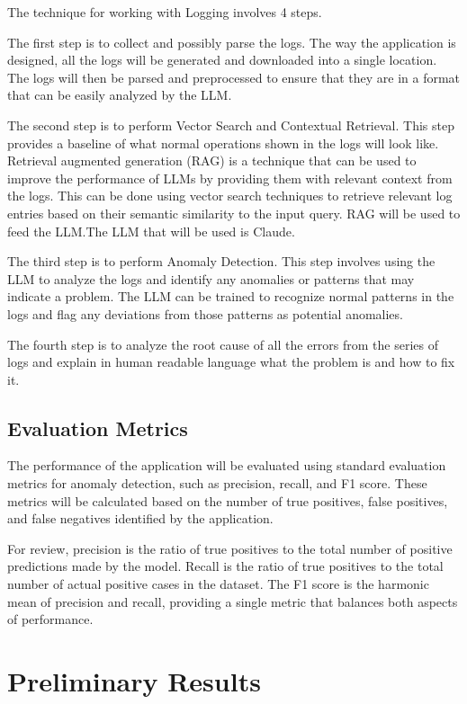 \documentclass[sigconf]{acmart}
\begin{document}
The technique for working with Logging involves 4 steps. 

The first step is to collect and possibly parse the logs. The way the application is designed, all the logs will be generated and downloaded into a single location. The logs will then be parsed and preprocessed to ensure that they are in a format that can be easily analyzed by the LLM.

The second step is to perform Vector Search and Contextual Retrieval. This step provides a baseline of what normal operations shown in the logs will look like. Retrieval augmented generation (RAG) is a technique that can be used to improve the performance of LLMs by providing them with relevant context from the logs. This can be done using vector search techniques to retrieve relevant log entries based on their semantic similarity to the input query. RAG will be used to feed the LLM.The LLM that will be used is Claude.

The third step is to perform Anomaly Detection. This step involves using the LLM to analyze the logs and identify any anomalies or patterns that may indicate a problem. The LLM can be trained to recognize normal patterns in the logs and flag any deviations from those patterns as potential anomalies.

The fourth step is to analyze the root cause of all the errors from the series of logs and explain in human readable language what the problem is and how to fix it. 

\subsection{Evaluation Metrics}

The performance of the application will be evaluated using standard evaluation metrics for anomaly detection, such as precision, recall, and F1 score. These metrics will be calculated based on the number of true positives, false positives, and false negatives identified by the application.

For review, precision is the ratio of true positives to the total number of positive predictions made by the model. Recall is the ratio of true positives to the total number of actual positive cases in the dataset. The F1 score is the harmonic mean of precision and recall, providing a single metric that balances both aspects of performance.

\section{Preliminary Results}
\end{document}
